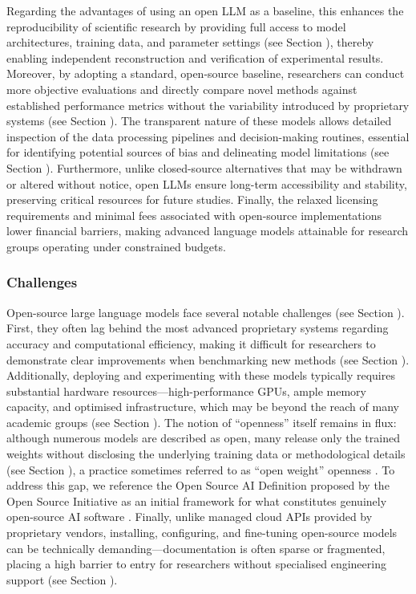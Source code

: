 Regarding the advantages of using an open LLM as a baseline, this enhances the reproducibility of scientific research by providing full access to model architectures, training data, and parameter settings (see Section \modelversion), thereby enabling independent reconstruction and verification of experimental results. Moreover, by adopting a standard, open-source baseline, researchers can conduct more objective evaluations and directly compare novel methods against established performance metrics without the variability introduced by proprietary systems (see Section \benchmarksmetrics). The transparent nature of these models allows detailed inspection of the data processing pipelines and decision-making routines, essential for identifying potential sources of bias and delineating model limitations (see Section \limitationsmitigations). Furthermore, unlike closed-source alternatives that may be withdrawn or altered without notice, open LLMs ensure long-term accessibility and stability, preserving critical resources for future studies. Finally, the relaxed licensing requirements and minimal fees associated with open-source implementations lower financial barriers, making advanced language models attainable for research groups operating under constrained budgets.


\subsubsection{Challenges}

Open-source large language models face several notable challenges (see Section \limitationsmitigations). First, they often lag behind the most advanced proprietary systems regarding accuracy and computational efficiency, making it difficult for researchers to demonstrate clear improvements when benchmarking new methods (see Section \benchmarksmetrics). Additionally, deploying and experimenting with these models typically requires substantial hardware resources—high-performance GPUs, ample memory capacity, and optimised infrastructure, which may be beyond the reach of many academic groups (see Section \toolarchitecture). The notion of “openness” itself remains in flux: although numerous models are described as open, many release only the trained weights without disclosing the underlying training data or methodological details (see Section \modelversion), a practice sometimes referred to as “open weight” openness \cite{Gibney2024}. To address this gap, we reference the Open Source AI Definition proposed by the Open Source Initiative as an initial framework for what constitutes genuinely open-source AI software \cite{OSIAI2024}. Finally, unlike managed cloud APIs provided by proprietary vendors, installing, configuring, and fine-tuning open-source models can be technically demanding—documentation is often sparse or fragmented, placing a high barrier to entry for researchers without specialised engineering support (see Section \limitationsmitigations).

